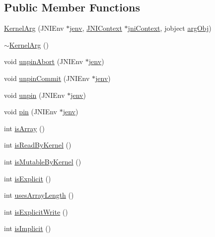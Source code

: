 \subsection*{Public Member Functions}
\begin{DoxyCompactItemize}
\item 
\hyperlink{class_kernel_arg_ae64310c9ca39693e96f97c78d2e484fa}{Kernel\-Arg} (J\-N\-I\-Env $\ast$\hyperlink{aparapi_8cpp_a31595c73e9a3750524b2ff61b5a14f96}{jenv}, \hyperlink{class_j_n_i_context}{J\-N\-I\-Context} $\ast$\hyperlink{class_kernel_arg_a5247a11aa8a301c025343b80ede7d9f5}{jni\-Context}, jobject \hyperlink{class_kernel_arg_a6c682f2814e39eca2a5bd66a056e69b5}{arg\-Obj})
\item 
\hyperlink{class_kernel_arg_acce352eb369167bfe41b7053fb13cc05}{$\sim$\-Kernel\-Arg} ()
\item 
void \hyperlink{class_kernel_arg_ab48f5be29c51a426b9b76353c593c47f}{unpin\-Abort} (J\-N\-I\-Env $\ast$\hyperlink{aparapi_8cpp_a31595c73e9a3750524b2ff61b5a14f96}{jenv})
\item 
void \hyperlink{class_kernel_arg_ac9b362583f7bfd45579728b64ef07c9a}{unpin\-Commit} (J\-N\-I\-Env $\ast$\hyperlink{aparapi_8cpp_a31595c73e9a3750524b2ff61b5a14f96}{jenv})
\item 
void \hyperlink{class_kernel_arg_ad3d62d6f3e6cc7891c0a871900dc7ee1}{unpin} (J\-N\-I\-Env $\ast$\hyperlink{aparapi_8cpp_a31595c73e9a3750524b2ff61b5a14f96}{jenv})
\item 
void \hyperlink{class_kernel_arg_a6fc2b16f01ddb5fba224d38fabc128cf}{pin} (J\-N\-I\-Env $\ast$\hyperlink{aparapi_8cpp_a31595c73e9a3750524b2ff61b5a14f96}{jenv})
\item 
int \hyperlink{class_kernel_arg_a5d1c17442e6f96aa1aeb834a82ed6950}{is\-Array} ()
\item 
int \hyperlink{class_kernel_arg_a164df3cf2ae35d7b53f5796e46c01fe5}{is\-Read\-By\-Kernel} ()
\item 
int \hyperlink{class_kernel_arg_aa1002b4a71aaa86b3089beee7f84d325}{is\-Mutable\-By\-Kernel} ()
\item 
int \hyperlink{class_kernel_arg_a14a83444c553bc8b8458223af8339e3d}{is\-Explicit} ()
\item 
int \hyperlink{class_kernel_arg_a4c7a7abe38cc18d254136b89ee817306}{uses\-Array\-Length} ()
\item 
int \hyperlink{class_kernel_arg_a080a2a1cae98156eec8dff6409b3c5f2}{is\-Explicit\-Write} ()
\item 
int \hyperlink{class_kernel_arg_ab8a775d67ecb9bf9c8ad4654fe7c3f58}{is\-Implicit} ()

\end{DoxyCompactItemize}
